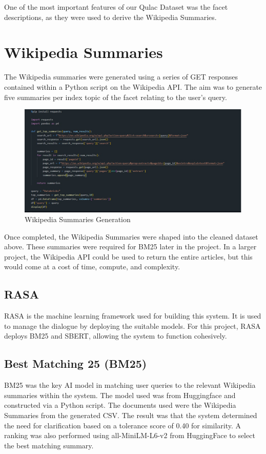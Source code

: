 \documentclass[11pt]{article}
\begin{document}
One of the most important features of our Qulac Dataset was the facet descriptions, as they were used to derive the Wikipedia Summaries.

\section{Wikipedia Summaries}
The Wikipedia summaries were generated using a series of GET responses contained within a Python script on the Wikipedia API. The aim was to generate five summaries per index \textendash{} topic of the facet \textendash{} relating to the user's query.

\begin{figure}[htbp]
  \centering
  \includegraphics[width=\linewidth]{./img/wiki.png}
  \caption{Wikipedia Summaries Generation}
  \label{fig:wikipedia method}
\end{figure}


Once completed, the Wikipedia Summaries were shaped into the cleaned dataset above. These summaries were required for BM25 later in the project. In a larger project, the Wikipedia API could be used to return the entire articles, but this would come at a cost of time, compute, and complexity.


\subsection{{RASA}}
RASA is the machine learning framework used for building this system. It is used to manage the dialogue by deploying the suitable models. For this project, RASA deploys BM25 and SBERT, allowing the system to function cohesively.

\subsection{Best Matching 25 (BM25)}
BM25 was the key AI model in matching user queries to the relevant Wikipedia summaries within the system. The model used was from Huggingface and constructed via a Python script. 
 \newline
 \newline
The documents used were the Wikipedia Summaries from the generated CSV. The result was that the system determined the need for clarification based on a tolerance score of 0.40 for similarity. A ranking was also performed using all-MiniLM-L6-v2 from HuggingFace to select the best matching summary.
\end{document}
